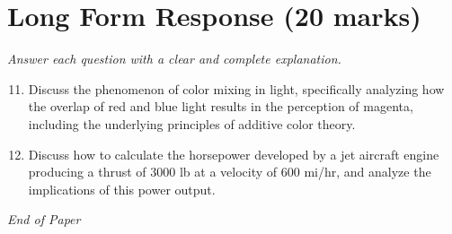 \documentclass[12pt]{article}
\begin{document}
\section*{Long Form Response (20 marks)}
\textit{Answer each question with a clear and complete explanation.}
\begin{enumerate}[label=\arabic*.]
\setcounter{enumi}{10}
\item Discuss the phenomenon of color mixing in light, specifically analyzing how the overlap of red and blue light results in the perception of magenta, including the underlying principles of additive color theory.
\item Discuss how to calculate the horsepower developed by a jet aircraft engine producing a thrust of 3000 lb at a velocity of 600 mi/hr, and analyze the implications of this power output.
\end{enumerate}

\vfill
\noindent\textit{End of Paper}
\end{document}
